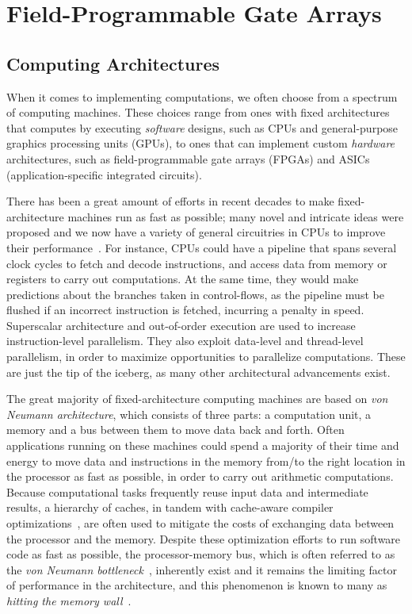 \section{Field-Programmable Gate Arrays}
\label{bg:sec:fpga}

\subsection{Computing Architectures}
\label{bg:sub:computing_architectures}

When it comes to implementing computations, we often choose from a spectrum of
computing machines.  These choices range from ones with fixed architectures
that computes by executing \emph{software} designs, such as CPUs and
general-purpose graphics processing units (GPUs), to ones that can implement
custom \emph{hardware} architectures, such as field-programmable gate arrays
(FPGAs) and ASICs (application-specific integrated circuits).

There has been a great amount of efforts in recent decades to make
fixed-architecture machines run as fast as possible; many novel and intricate
ideas were proposed and we now have a variety of general circuitries in CPUs
to improve their performance~\cite{comparch}.  For instance, CPUs could have a
pipeline that spans several clock cycles to fetch and decode instructions, and
access data from memory or registers to carry out computations.  At the same
time, they would make predictions about the branches taken in control-flows, as
the pipeline must be flushed if an incorrect instruction is fetched, incurring
a penalty in speed.  Superscalar architecture and out-of-order execution
are used to increase instruction-level parallelism.  They also exploit
data-level and thread-level parallelism, in order to maximize opportunities to
parallelize computations.  These are just the tip of the iceberg, as many other
architectural advancements exist.

The great majority of fixed-architecture computing machines are based on
\emph{von Neumann architecture}, which consists of three parts: a computation
unit, a memory and a bus between them to move data back and forth.  Often
applications running on these machines could spend a majority of their time
and energy to move data and instructions in the memory from/to the right
location in the processor as fast as possible, in order to carry out arithmetic
computations.  Because computational tasks frequently reuse input data and
intermediate results, a hierarchy of caches, in tandem with cache-aware
compiler optimizations~\cite{kowarschik03}, are often used to mitigate the
costs of exchanging data between the processor and the memory.  Despite
these optimization efforts to run software code as fast as possible, the
processor-memory bus, which is often referred to as the \emph{von Neumann
bottleneck}~\cite{backus78}, inherently exist and it remains the limiting
factor of performance in the architecture, and this phenomenon is known to many
as \emph{hitting the memory wall}~\cite{bacon13, wulf94}.

